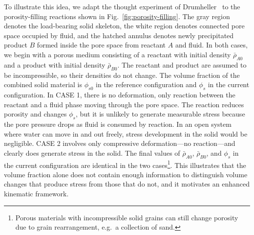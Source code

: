\documentclass[11pt]{article}
\begin{document}
To illustrate this idea, we adapt the thought experiment of Drumheller~\cite{drumheller2000} to the porosity-filling reactions shown in Fig.~\ref{fig:porosity-filling}. The gray region denotes the load-bearing solid skeleton, the white region denotes connected pore space occupied by fluid, and the hatched annulus denotes newly precipitated product $B$ formed inside the pore space from reactant $A$ and fluid. In both cases, we begin with a porous medium consisting of a reactant with initial density $\bar\rho_{A0}$ and a product with initial density $\bar\rho_{B0}$. The reactant and product are assumed to be incompressible, so their densities do not change. The volume fraction of the combined solid material is $\phi_{s0}$ in the reference configuration and $\phi_s$ in the current configuration. In CASE 1, there is no deformation, only reaction between the reactant and a fluid phase moving through the pore space. The reaction reduces porosity and changes $\phi_s$, but it is unlikely to generate measurable stress because the pore pressure drops as fluid is consumed by reaction. In an open system where water can move in and out freely, stress development in the solid would be negligible. CASE 2 involves only compressive deformation---no reaction---and clearly does generate stress in the solid. The final values of $\bar\rho_{A0}$, $\bar\rho_{B0}$, and $\phi_s$ in the current configuration are identical in the two cases\footnote{Porous materials with incompressible solid grains can still change porosity due to grain rearrangement, e.g.\ a collection of sand.}. This illustrates that the volume fraction alone does not contain enough information to distinguish volume changes that produce stress from those that do not, and it motivates an enhanced kinematic framework.
%
\end{document}

